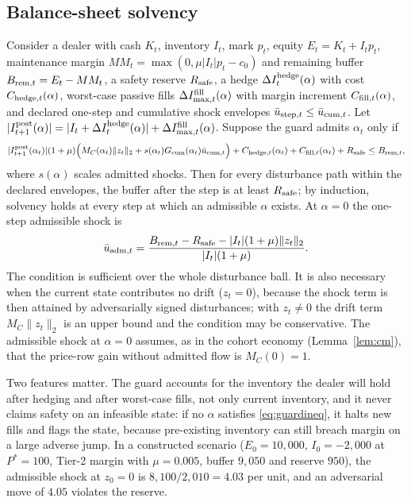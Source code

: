 \subsection{Balance-sheet solvency}

\begin{theorem}\label{thm:forward}
Consider a dealer with cash $K_t$, inventory $I_t$, mark $p_t$, equity $E_t=K_t+I_tp_t$, maintenance margin $MM_t=\max(0,\mu|I_t|p_t-c_0)$ and remaining buffer $B_{{\rm rem},t}=E_t-MM_t$, a safety reserve $R_{\rm safe}$, a hedge $\Delta I^{\rm hedge}_t(\alpha)$ with cost $C_{{\rm hedge},t}(\alpha)$, worst-case passive fills $\Delta I^{\rm fill}_{\max,t}(\alpha)$ with margin increment $C_{{\rm fill},t}(\alpha)$, and declared one-step and cumulative shock envelopes $\bar u_{{\rm step},t}\le\bar u_{{\rm cum},t}$. Let $|I^{\rm post}_{t+1}(\alpha)|=|I_t+\Delta I^{\rm hedge}_t(\alpha)|+\Delta I^{\rm fill}_{\max,t}(\alpha)$. Suppose the guard admits $\alpha_t$ only if
\begin{equation}\label{eq:guardineq}
|I^{\rm post}_{t+1}(\alpha_t)|(1+\mu)\Bigl(M_{C}(\alpha_t)\|z_t\|_2+s(\alpha_t)G_{\rm cum}(\alpha_t)\bar u_{{\rm cum},t}\Bigr)+C_{{\rm hedge},t}(\alpha_t)+C_{{\rm fill},t}(\alpha_t)+R_{\rm safe}\le B_{{\rm rem},t},
\end{equation}
where $s(\alpha)$ scales admitted shocks. Then for every disturbance path within the declared envelopes, the buffer after the step is at least $R_{\rm safe}$; by induction, solvency holds at every step at which an admissible $\alpha$ exists. At $\alpha=0$ the one-step admissible shock is
\[
\bar u_{{\rm adm},t}=\frac{B_{{\rm rem},t}-R_{\rm safe}-|I_t|(1+\mu)\|z_t\|_2}{|I_t|(1+\mu)} .
\]
The condition is sufficient over the whole disturbance ball. It is also necessary when the current state contributes no drift ($z_t=0$), because the shock term is then attained by adversarially signed disturbances; with $z_t\neq0$ the drift term $M_C\|z_t\|_2$ is an upper bound and the condition may be conservative. The admissible shock at $\alpha=0$ assumes, as in the cohort economy (Lemma~\ref{lem:cm}), that the price-row gain without admitted flow is $M_C(0)=1$.
\end{theorem}

Two features matter. The guard accounts for the inventory the dealer will hold after hedging and after worst-case fills, not only current inventory, and it never claims safety on an infeasible state: if no $\alpha$ satisfies \eqref{eq:guardineq}, it halts new fills and flags the state, because pre-existing inventory can still breach margin on a large adverse jump. In a constructed scenario ($E_0=10{,}000$, $I_0=-2{,}000$ at $P^*=100$, Tier-2 margin with $\mu=0.005$, buffer $9{,}050$ and reserve $950$), the admissible shock at $z_0=0$ is $8{,}100/2{,}010=4.03$ per unit, and an adversarial move of $4.05$ violates the reserve.

